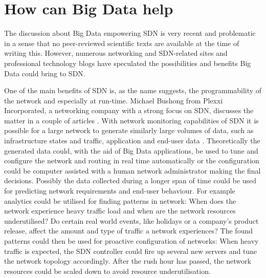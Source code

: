 \documentclass{acm_proc_article-sp}
\begin{document}
\section{How can Big Data help}

The discussion about Big Data empowering SDN is very recent and problematic in a sense that no peer-reviewed scientific texts are available at the time of writing this. However, numerous networking and SDN-related sites and professional technology blogs have speculated the possibilities and benefits Big Data could bring to SDN.

One of the main benefits of SDN is, as the name suggests, the programmability of the network and especially at run-time. Michael Bushong from Plexxi Incorporated, a networking company with a strong focus on SDN, discusses the matter in a couple of articles \cite{Bushong2013, Bushong2013-2}. With network monitoring capabilities of SDN it is possible for a large network to generate similarly large volumes of data, such as infrastructure states and traffic, application and end-user data \cite{Bushong2013}. Theoretically the generated data could, with the aid of Big Data applications, be used to tune and configure the network and routing in real time automatically or the configuration could be computer assisted with a human network administrator making the final decisions. Possibly the data collected during a longer span of time could be used for predicting network requirements and end-user behaviour. For example analytics could be utilised for finding patterns in network: When does the network experience heavy traffic load and when are the network resources underutilised? Do certain real world events, like holidays or a company's product release, affect the amount and type of traffic a network experiences? The found patterns could then be used for proactive configuration of networks: When heavy traffic is expected, the SDN controller could fire up several new servers and tune the network topology accordingly. After the rush hour has passed, the network resources could be scaled down to avoid resource underutilisation.
\end{document}
